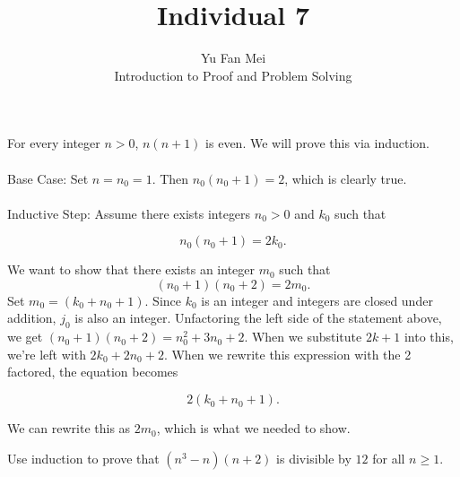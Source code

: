 \documentclass[12pt]{article}
\newenvironment{lemma}[2][Lemma]{\begin{trivlist}
\item[\hskip \labelsep {\bfseries #1}\hskip \labelsep {\bfseries #2.}]}{\end{trivlist}}
\newenvironment{problem}[2][Problem]{\begin{trivlist}
\item[\hskip \labelsep {\bfseries #1}\hskip \labelsep {\bfseries #2.}]}{\end{trivlist}}
\begin{document}

\title{Individual 7}%
\author{Yu Fan Mei\\ %
	Introduction to Proof and Problem Solving} %

\maketitle

\begin{lemma}{1} For every integer $n > 0$, $n(n+1)$ is even. We will prove this via induction. \noindent \\ \\
    Base Case: Set $n = n_0 = 1$. Then $n_0(n_0+1) = 2$, which is clearly true. \\ \\ \noindent
    Inductive Step: Assume there exists integers $n_0 > 0$ and $k_0$ such that

    $$n_0(n_0+1) = 2k_0.$$

    We want to show that there exists an integer $m_0$ such that
    $$(n_0+1)(n_0+2) = 2m_0.$$
    Set $m_0 = (k_0 + n_0 + 1)$. Since $k_0$ is an integer and integers are closed under addition, $j_0$ is also an integer. Unfactoring the left side of the statement above, we get $(n_0+1)(n_0+2) = n_0^2 + 3n_0 + 2$. When we substitute $2k+1$ into this, we're left with $2k_0 + 2n_0 + 2$. When we rewrite this expression with the 2 factored, the equation becomes

    $$2(k_0 + n_0 + 1).$$

    We can rewrite this as $2m_0$, which is what we needed to show.
\end{lemma}

\begin{problem}{1}
    Use induction to prove that $(n^3 - n)(n + 2)$ is divisible by $12$ for all $n \geq 1$.
\end{problem}
\end{document}
